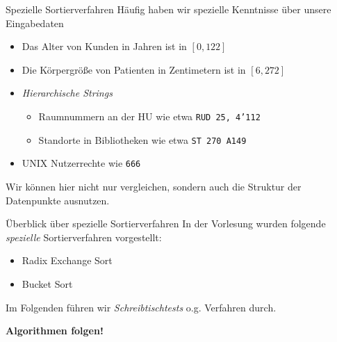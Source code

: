 \begin{frame}{Spezielle Sortierverfahren}
H\"aufig haben wir \alert{spezielle Kenntnisse} \"uber unsere Eingabedaten
\begin{itemize}
    \item Das Alter von Kunden in Jahren ist in $[0, 122]$
    \item Die K\"orpergr\"o{\ss}e von Patienten in Zentimetern ist in $[6, 272]$
    \item \emph{Hierarchische Strings}
    \begin{itemize}
        \item Raumnummern an der HU wie etwa \texttt{RUD 25, 4'112}
        \item Standorte in Bibliotheken wie etwa \texttt{ST 270 A149}
    \end{itemize}
    \item UNIX Nutzerrechte wie \texttt{666}
\end{itemize}
Wir k\"onnen hier nicht nur vergleichen, sondern auch die \alert{Struktur} der Datenpunkte ausnutzen.
\end{frame}

\begin{frame}{\"Uberblick \"uber spezielle Sortierverfahren}
In der Vorlesung wurden folgende \emph{spezielle} Sortierverfahren vorgestellt:
\begin{itemize}
    \item Radix Exchange Sort
    \item Bucket Sort
\end{itemize}
Im Folgenden f\"uhren wir \emph{Schreibtischtests} o.g. Verfahren durch.

\medskip

\textbf{Algorithmen folgen!}
\end{frame}
